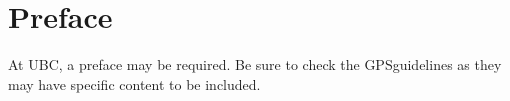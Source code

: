 
\chapter{Preface}

At UBC, a preface may be required.  Be sure to check the
GPSguidelines as they may have specific content to be included.
